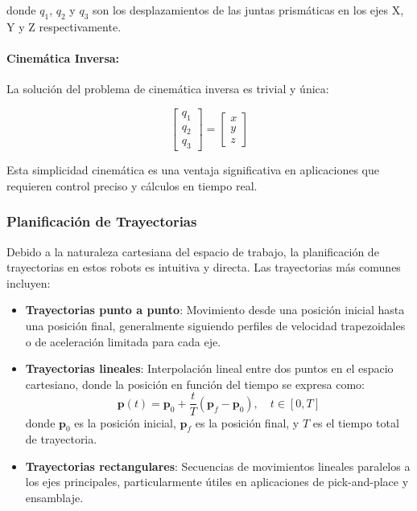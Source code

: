 donde $q_1$, $q_2$ y $q_3$ son los desplazamientos de las juntas prismáticas en los ejes X, Y y Z respectivamente.

\paragraph{Cinemática Inversa:} La solución del problema de cinemática inversa es trivial y única:

\begin{equation}
\begin{bmatrix}
q_1 \\
q_2 \\
q_3
\end{bmatrix}
=
\begin{bmatrix}
x \\
y \\
z
\end{bmatrix}
\end{equation}

Esta simplicidad cinemática es una ventaja significativa en aplicaciones que requieren control preciso y cálculos en tiempo real.

\subsubsection{Planificación de Trayectorias}

Debido a la naturaleza cartesiana del espacio de trabajo, la planificación de trayectorias en estos robots es intuitiva y directa. Las trayectorias más comunes incluyen:

\begin{itemize}
    \item \textbf{Trayectorias punto a punto}: Movimiento desde una posición inicial hasta una posición final, generalmente siguiendo perfiles de velocidad trapezoidales o de aceleración limitada para cada eje.
    
    \item \textbf{Trayectorias lineales}: Interpolación lineal entre dos puntos en el espacio cartesiano, donde la posición en función del tiempo se expresa como:
    \begin{equation}
    \mathbf{p}(t) = \mathbf{p}_0 + \frac{t}{T}(\mathbf{p}_f - \mathbf{p}_0), \quad t \in [0, T]
    \end{equation}
    donde $\mathbf{p}_0$ es la posición inicial, $\mathbf{p}_f$ es la posición final, y $T$ es el tiempo total de trayectoria.
    
    \item \textbf{Trayectorias rectangulares}: Secuencias de movimientos lineales paralelos a los ejes principales, particularmente útiles en aplicaciones de pick-and-place y ensamblaje.
\end{itemize}


